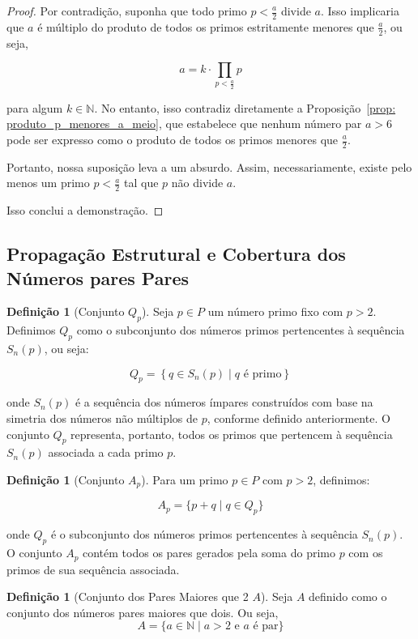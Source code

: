 \documentclass[a4paper,11pt]{article}
\theoremstyle{definition}
\newtheorem{definition}[theorem]{Definição}
\theoremstyle{remark}
\begin{document}
\begin{otherlanguage}{brazil}
	\begin{proof}
		Por contradição, suponha que todo primo \(p < \frac{a}{2}\) divide \(a\). Isso implicaria que \(a\) é múltiplo do produto de todos os primos estritamente menores que \(\frac{a}{2}\), ou seja,
		
		\[
		a = k \cdot \prod_{p < \frac{a}{2}} p
		\]
		
		para algum \(k \in \mathbb{N}\). No entanto, isso contradiz diretamente a Proposição~\ref{prop: produto_p_menores_a_meio}, que estabelece que nenhum número par \(a > 6\) pode ser expresso como o produto de todos os primos menores que \(\frac{a}{2}\).
		
		Portanto, nossa suposição leva a um absurdo. Assim, necessariamente, existe pelo menos um primo \(p < \frac{a}{2}\) tal que \(p\) não divide \(a\).
		
		Isso conclui a demonstração.
	\end{proof}
	
	\subsection{Propagação Estrutural e Cobertura dos Números pares Pares}
	\begin{definition}[Conjunto \(Q_p\)]
		Seja \(p \in P\) um número primo fixo com \(p > 2\). Definimos \(Q_p\) como o subconjunto dos números primos pertencentes à sequência \(S_n(p)\), ou seja:
		
		\[
		Q_p = \left\{ q \in S_n(p) \mid q \text{ é primo} \right\}
		\]
		
		onde \(S_n(p)\) é a sequência dos números ímpares construídos com base na simetria dos números não múltiplos de \(p\), conforme definido anteriormente. O conjunto \(Q_p\) representa, portanto, todos os primos que pertencem à sequência \(S_n(p)\) associada a cada primo \(p\).
	\end{definition}
	
	
	\begin{definition}[Conjunto \(A_p\)]
		Para um primo \(p \in P\) com \(p > 2\), definimos:
		
		\[
		A_p = \{p + q \mid q \in Q_p\}
		\]
		
		onde \(Q_p\) é o subconjunto dos números primos pertencentes à sequência \(S_n(p)\). O conjunto \(A_p\) contém todos os pares gerados pela soma do primo \(p\) com os primos de sua sequência associada.
	\end{definition}
	
	\begin{definition}[Conjunto dos Pares Maiores que 2 \(A\)]
		Seja \(A\) definido como o conjunto dos números pares maiores que dois. Ou seja, 
		\[
		A = \{a \in \mathbb{N} \mid a > 2 \text{ e } a \text{ é par} \}
		\]
	\end{definition}
	

\end{otherlanguage}
\end{document}
